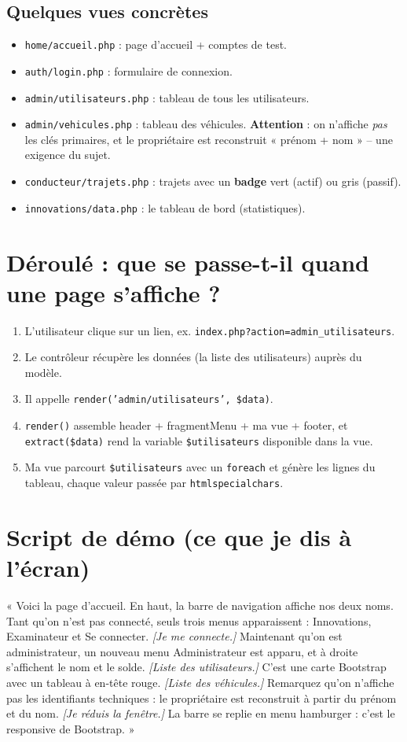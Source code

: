 \documentclass[11pt,a4paper]{article}
\begin{document}
\subsection{Quelques vues concrètes}
\begin{itemize}[noitemsep]
  \item \texttt{home/accueil.php} : page d'accueil + comptes de test.
  \item \texttt{auth/login.php} : formulaire de connexion.
  \item \texttt{admin/utilisateurs.php} : tableau de tous les utilisateurs.
  \item \texttt{admin/vehicules.php} : tableau des véhicules. \textbf{Attention} :
        on n'affiche \emph{pas} les clés primaires, et le propriétaire est
        reconstruit « prénom + nom » -- une exigence du sujet.
  \item \texttt{conducteur/trajets.php} : trajets avec un \textbf{badge} vert
        (actif) ou gris (passif).
  \item \texttt{innovations/data.php} : le tableau de bord (statistiques).
\end{itemize}

\section{Déroulé : que se passe-t-il quand une page s'affiche ?}
\begin{enumerate}[noitemsep]
  \item L'utilisateur clique sur un lien, ex. \texttt{index.php?action=admin\_utilisateurs}.
  \item Le contrôleur récupère les données (la liste des utilisateurs) auprès du modèle.
  \item Il appelle \texttt{render('admin/utilisateurs', \$data)}.
  \item \texttt{render()} assemble header + fragmentMenu + ma vue + footer, et
        \texttt{extract(\$data)} rend la variable \texttt{\$utilisateurs}
        disponible dans la vue.
  \item Ma vue parcourt \texttt{\$utilisateurs} avec un \texttt{foreach} et génère
        les lignes du tableau, chaque valeur passée par \texttt{htmlspecialchars}.
\end{enumerate}

\section{Script de démo (ce que je dis à l'écran)}
« Voici la page d'accueil. En haut, la barre de navigation affiche nos deux noms.
Tant qu'on n'est pas connecté, seuls trois menus apparaissent : Innovations,
Examinateur et Se connecter. \emph{[Je me connecte.]} Maintenant qu'on est
administrateur, un nouveau menu Administrateur est apparu, et à droite s'affichent
le nom et le solde. \emph{[Liste des utilisateurs.]} C'est une carte Bootstrap avec
un tableau à en-tête rouge. \emph{[Liste des véhicules.]} Remarquez qu'on n'affiche
pas les identifiants techniques : le propriétaire est reconstruit à partir du
prénom et du nom. \emph{[Je réduis la fenêtre.]} La barre se replie en menu
hamburger : c'est le responsive de Bootstrap. »
\end{document}
